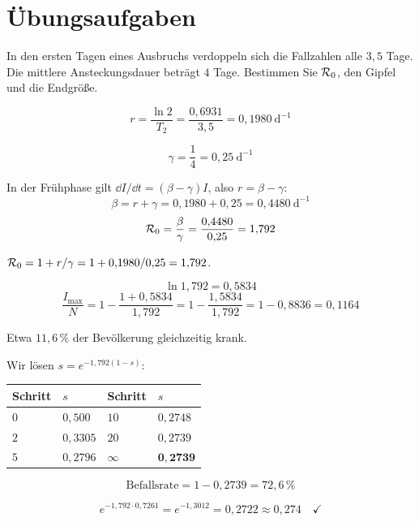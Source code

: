 \section{Übungsaufgaben}

\begin{aufgabe}
In den ersten Tagen eines Ausbruchs verdoppeln sich die Fallzahlen alle $3{,}5$ Tage. Die mittlere Ansteckungsdauer beträgt $4$ Tage. Bestimmen Sie $\mathcal{R}_0$, den Gipfel und die Endgröße.

\loesung
{}
\[ r = \frac{\ln 2}{T_2} = \frac{0{,}6931}{3{,}5} = 0{,}1980\ \mathrm{d}^{-1} \]

\[ \gamma = \frac{1}{4} = 0{,}25\ \mathrm{d}^{-1} \]

In der Frühphase gilt $\dd I/\dd t = (\beta-\gamma)I$, also $r = \beta - \gamma$:
\[ \beta = r + \gamma = 0{,}1980 + 0{,}25 = 0{,}4480\ \mathrm{d}^{-1} \]
\[ \mathcal{R}_0 = \frac{\beta}{\gamma} = \frac{0{,}4480}{0{,}25} = 1{,}792 \]

 $\mathcal{R}_0 = 1 + r/\gamma = 1 + 0{,}1980/0{,}25 = 1{,}792$. \checkmark

\[ \ln 1{,}792 = 0{,}5834 \]
\[ \frac{I_{\max}}{N} = 1 - \frac{1+0{,}5834}{1{,}792} = 1 - \frac{1{,}5834}{1{,}792} = 1 - 0{,}8836 = 0{,}1164 \]

Etwa $11{,}6\,\%$ der Bevölkerung gleichzeitig krank.

Wir lösen $s = e^{-1{,}792(1-s)}$:
\begin{center}
\renewcommand{\arraystretch}{1.38}
\begin{tabular}{@{}P{1.6cm}P{2.0cm}P{1.6cm}P{2.0cm}@{}}
\toprule
Schritt & $s$ & Schritt & $s$\\
\midrule
$0$ & $0{,}500$ & $10$ & $0{,}2748$\\
$2$ & $0{,}3305$ & $20$ & $0{,}2739$\\
$5$ & $0{,}2796$ & $\infty$ & $\mathbf{0{,}2739}$\\
\bottomrule
\end{tabular}
\end{center}
\[ \text{Befallsrate} = 1 - 0{,}2739 = 72{,}6\,\% \]

\[ e^{-1{,}792 \cdot 0{,}7261} = e^{-1{,}3012} = 0{,}2722 \approx 0{,}274 \quad \checkmark \]


\end{aufgabe}
